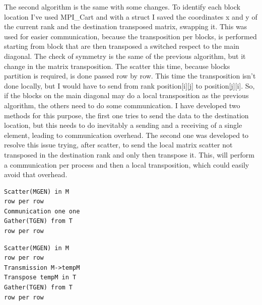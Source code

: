 The second algorithm is the same with some changes. To identify each block location I've used MPI\_Cart and with a struct I saved the coordinates x and y of the current rank and the destination transposed matrix, swapping it. This was used for easier communication, because the transposition per blocks, is performed starting from block that are then transposed a switched respect to the main diagonal. The check of symmetry is the same of the previous algorithm, but it change in the matrix transposition. The scatter this time, because blocks partition is required, is done passed row by row. This time the transposition isn't done locally, but I would have to send from rank position[i][j] to position[j][i]. So, if the blocks on the main diagonal may do a local transposition as the previous algorithm, the others need to do some communication.
I have developed two methods for this purpose, the first one tries to send the data to the destination location, but this needs to do inevitably a sending and a receiving of a single element, leading to communication overhead. The second one was developed to resolve this issue trying, after scatter, to send the local matrix scatter not transposed in the destination rank and only then transpose it. This, will perform a communication per process and then a local transposition, which could easily avoid that overhead. 
\begin{minipage}[!ht]{0.5\columnwidth} 
\begin{lstlisting}[style=Cstyle, caption={1-1 communication}]
Scatter(MGEN) in M
row per row
Communication one one
Gather(TGEN) from T
row per row
\end{lstlisting}
\end{minipage}\hfill
\begin{minipage}[!ht]{0.5\columnwidth}
\begin{lstlisting}[style=Cstyle, caption={Optimized Approach}]
Scatter(MGEN) in M
row per row
Transmission M->tempM
Transpose tempM in T
Gather(TGEN) from T
row per row
\end{lstlisting}
\end{minipage}
